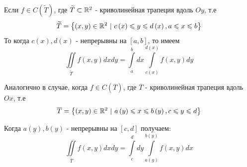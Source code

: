 \documentclass[../../main.tex]{subfiles}
\begin{document}
\begin{crl}
	Если $ f \in C \left( \widetilde{T} \right) $, где $ \widetilde{T} \subset \mathbb{R}^2 $ - 
	криволинейная трапеция вдоль $ Oy $, т.е 
	\begin{equation}
	\label{lec_13, num_19}
	\widetilde{T} = \left\lbrace 
	\left( x, y\right) \in \mathbb{R}^2\ | \ c \left( x \right) \leqslant y \leqslant d \left( x \right),
	 a \leqslant x \leqslant b \right\rbrace
	 \end{equation}
	 То когда $c \left( x \right), d \left( x \right) $ - непрерывны на 
	 $ \left[ a, b \right] $, то имеем
	 \begin{equation}
	 \label{lec_13, num_20}
	 \iint\limits_{\widetilde{T}} f \left( x, y \right)  dxdy = 
	 \int\limits_a^b dx \int\limits_{c \left( x \right) }^{ d \left( x \right) } 
	 f \left( x, y \right) dy
	 \end{equation}
	 
	 Аналогично в случае, когда $ f \in C \left( \overline{T} \right) $, где $ \overline{T} $ - 
	 криволинейная трапеция вдоль $ Ox $, т.е 
	 \begin{equation}
	 \label{lec_13, num_21}
	 \overline{T} = \left\lbrace 
	 \left( x, y\right) \in \mathbb{R}^2\ | \ a \left( y \right) \leqslant x \leqslant b \left( y \right),
	 c \leqslant y \leqslant d \right\rbrace
	 \end{equation}
	 
	 Когда $ a \left( y \right), b \left( y \right) $ - непрерывны на $ \left[ c, d \right] $
	 получаем:
	 \begin{equation}
	 \label{lec_13, num_22}
	 \iint\limits_{\overline{T}} f \left( x, y \right) dx dy = \int\limits_c^d dy 
	 \int\limits_{a \left( y \right) } ^ {b \left( y \right) } f \left( x, y \right) dx
	 \end{equation}
\end{crl}
\end{document}
